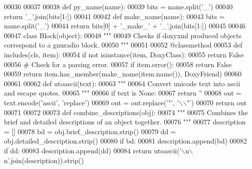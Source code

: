 \begin{DoxyCode}
00036 
00037 
00038 \textcolor{keyword}{def }py_name(name):
00039     bits = name.split(\textcolor{stringliteral}{'\_'})
00040     \textcolor{keywordflow}{return} \textcolor{stringliteral}{'\_'}.join(bits[1:])
00041 
00042 \textcolor{keyword}{def }make_name(name):
00043     bits = name.split(\textcolor{stringliteral}{'\_'})
00044     \textcolor{keywordflow}{return} bits[0] + \textcolor{stringliteral}{'\_make\_'} + \textcolor{stringliteral}{'\_'}.join(bits[1:])
00045 
00046 
00047 \textcolor{keyword}{class }Block(object):
00048     \textcolor{stringliteral}{"""}
00049 \textcolor{stringliteral}{    Checks if doxyxml produced objects correspond to a gnuradio block.}
00050 \textcolor{stringliteral}{    """}
00051 
00052     @classmethod
00053     \textcolor{keyword}{def }includes(cls, item):
00054         \textcolor{keywordflow}{if} \textcolor{keywordflow}{not} isinstance(item, DoxyClass):
00055             \textcolor{keywordflow}{return} \textcolor{keyword}{False}
00056         \textcolor{comment}{# Check for a parsing error.}
00057         \textcolor{keywordflow}{if} item.error():
00058             \textcolor{keywordflow}{return} \textcolor{keyword}{False}
00059         \textcolor{keywordflow}{return} item.has\_member(make_name(item.name()), DoxyFriend)
00060 
00061 
00062 \textcolor{keyword}{def }utoascii(text):
00063     \textcolor{stringliteral}{"""}
00064 \textcolor{stringliteral}{    Convert unicode text into ascii and escape quotes.}
00065 \textcolor{stringliteral}{    """}
00066     \textcolor{keywordflow}{if} text \textcolor{keywordflow}{is} \textcolor{keywordtype}{None}:
00067         \textcolor{keywordflow}{return} \textcolor{stringliteral}{''}
00068     out = text.encode(\textcolor{stringliteral}{'ascii'}, \textcolor{stringliteral}{'replace'})
00069     out = out.replace(\textcolor{stringliteral}{'"'}, \textcolor{stringliteral}{'\(\backslash\)\(\backslash\)"'})
00070     \textcolor{keywordflow}{return} out
00071 
00072 
00073 \textcolor{keyword}{def }combine_descriptions(obj):
00074     \textcolor{stringliteral}{"""}
00075 \textcolor{stringliteral}{    Combines the brief and detailed descriptions of an object together.}
00076 \textcolor{stringliteral}{    """}
00077     description = []
00078     bd = obj.brief\_description.strip()
00079     dd = obj.detailed\_description.strip()
00080     \textcolor{keywordflow}{if} bd:
00081         description.append(bd)
00082     \textcolor{keywordflow}{if} dd:
00083         description.append(dd)
00084     \textcolor{keywordflow}{return} utoascii(\textcolor{stringliteral}{'\(\backslash\)n\(\backslash\)n'}.join(description)).strip()

\end{DoxyCode}
